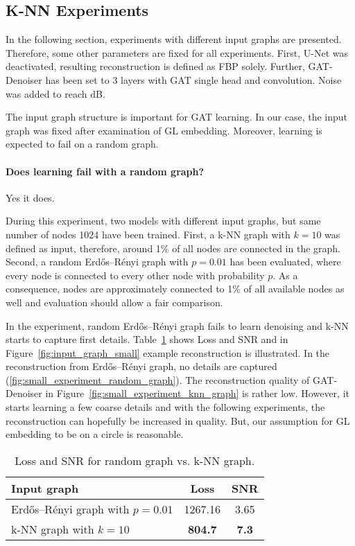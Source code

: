  \subsection{K-NN Experiments}
  In the following section, experiments with different input graphs are presented.
  Therefore, some other parameters are fixed for all experiments.
  First, U-Net was deactivated, resulting reconstruction is defined as FBP solely.
  Further, GAT-Denoiser has been set to 3 layers with GAT single head and convolution. 
  Noise was added to reach  dB.

  The input graph structure is important for GAT learning.
  In our case, the input graph was fixed after examination of GL embedding.
  Moreover, learning is expected to fail on a random graph.

  \paragraph{Does learning fail with a random graph?}
  Yes it does.

  During this experiment, two models with different input graphs, but same number of nodes 1024 have been trained.
  First, a k-NN graph with $k=10$ was defined as input, therefore, around 1\% of all nodes are connected in the graph.
  Second, a random Erdős–Rényi graph with $p=0.01$ has been evaluated, where every node is 
  connected to every other node with probability $p$. 
  As a consequence, nodes are approximately connected to 1\% of all available nodes as well and 
  evaluation should allow a fair comparison.
  
  In the experiment, random Erdős–Rényi graph fails to learn denoising and k-NN starts to capture first details.
  Table~\ref{tab:input_graph} shows Loss and SNR and in Figure~\ref{fig:input_graph_small} example reconstruction is illustrated.
  In the reconstruction from Erdős–Rényi graph, no details are captured (\ref{fig:small_experiment_random_graph}). 
  The reconstruction quality of GAT-Denoiser in Figure~\ref{fig:small_experiment_knn_graph} is rather low. 
  However, it starts learning a few coarse details and with the following experiments, the reconstruction can hopefully be 
  increased in quality. But, our assumption for GL embedding to be on a circle is reasonable.

  \begin{table}[H]
    \centering
      \begin{tabular}{l|cc}
      \toprule
      \textbf{Input graph} & \textbf{Loss} & \textbf{SNR}  \\ 
      \midrule
      Erdős–Rényi graph with $p=0.01$    &  1267.16         &  3.65   \\ \hline
      k-NN graph with $k=10$             &  \textbf{804.7}           &  \textbf{7.3 }   \\ \hline
      \midrule
      \end{tabular}
    \caption{Loss and SNR for random graph vs. k-NN graph. }
    \label{tab:input_graph}
  \end{table}

